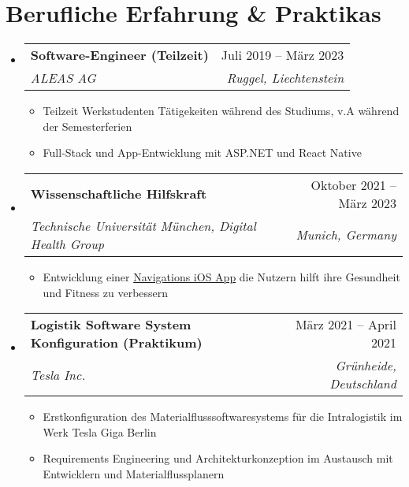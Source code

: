 \documentclass[letterpaper,11pt]{article}
\makeatletter
\newcommand{\resumeItem}[1]{
  \item\small{
    {#1 \vspace{-2pt}}
  }
}
\newcommand{\resumeSubheading}[4]{
  \vspace{-2pt}\item
    \begin{tabular*}{0.97\textwidth}[t]{l@{\extracolsep{\fill}}r}
      \textbf{#1} & #2 \\
      \textit{\small#3} & \textit{\small #4} \\
    \end{tabular*}\vspace{-7pt}
}
\newcommand{\resumeSubHeadingListStart}{\begin{itemize}[leftmargin=0.15in, label={}]}
\newcommand{\resumeSubHeadingListEnd}{\end{itemize}}
\newcommand{\resumeItemListStart}{\begin{itemize}}
\newcommand{\resumeItemListEnd}{\end{itemize}\vspace{-5pt}}
\makeatother
\begin{document}
\section{Berufliche Erfahrung \& Praktikas}
  \resumeSubHeadingListStart

    \resumeSubheading
      {Software-Engineer (Teilzeit)}{Juli 2019 -- März 2023}
      {ALEAS AG}{Ruggel, Liechtenstein}
      \resumeItemListStart
        \resumeItem{Teilzeit Werkstudenten Tätigekeiten während des Studiums, v.A während der Semesterferien}
        \resumeItem{Full-Stack und App-Entwicklung mit ASP.NET und React Native}
      \resumeItemListEnd

    \resumeSubheading
      {Wissenschaftliche Hilfskraft}{Oktober 2021 -- März 2023}
      {Technische Universität München, Digital Health Group}{Munich, Germany}
      \resumeItemListStart
        \resumeItem{Entwicklung einer \href{https://github.com/dhg-applab/HeMo}{Navigations iOS App} die Nutzern hilft ihre Gesundheit und Fitness zu verbessern}
      \resumeItemListEnd

    \resumeSubheading
      {Logistik Software System Konfiguration (Praktikum)}{März 2021 -- April 2021}
      {Tesla Inc.}{Grünheide, Deutschland}
      \resumeItemListStart
     
        \resumeItem{Erstkonfiguration des Materialflusssoftwaresystems für die Intralogistik im Werk Tesla Giga Berlin}
        \resumeItem{Requirements Engineering und Architekturkonzeption im Austausch mit Entwicklern und Materialflussplanern}
      \resumeItemListEnd


  \resumeSubHeadingListEnd
\end{document}
